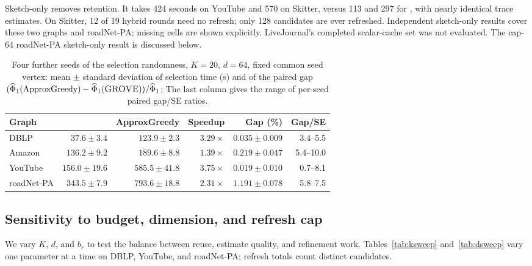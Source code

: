 Sketch-only removes retention. It takes 424 seconds on YouTube and
570 on Skitter, versus 113 and 297 for \alg{}, with nearly identical
trace estimates. On Skitter, 12 of 19 hybrid rounds need no refresh;
only 128 candidates are ever refreshed. Independent sketch-only
results cover these two graphs and roadNet-PA; missing cells are
shown explicitly. LiveJournal's completed scalar-cache set was not
evaluated. The cap-64 roadNet-PA sketch-only result is discussed below.

\begin{table}[t]
\centering\footnotesize
\caption{Four further seeds of the selection randomness, $K=20$,
$d=64$, fixed common seed vertex: mean $\pm$ standard deviation of
selection time (s) and of the paired gap
$(\widehat\Phi_1(\text{ApproxGreedy})-\widehat\Phi_1(\textsc{GROVE}{}))/\widehat\Phi_1$;
The last column gives the range of per-seed paired gap/SE ratios.}\label{tab:seeds5}
\setlength{\tabcolsep}{2pt}
\begin{tabular}{@{}lrrrrr@{}}\toprule
Graph & \alg{} & ApproxGreedy & Speedup & Gap (\%) & Gap/SE\\\midrule
DBLP & $37.6\pm3.4$ & $123.9\pm2.3$ & $3.29\times$ & $0.035\pm0.009$ & 3.4--5.5\\
Amazon & $136.2\pm9.2$ & $189.6\pm8.8$ & $1.39\times$ & $0.219\pm0.047$ & 5.4--10.0\\
YouTube & $156.0\pm19.6$ & $585.5\pm41.8$ & $3.75\times$ & $0.019\pm0.010$ & 0.7--8.1\\
roadNet-PA & $343.5\pm7.9$ & $793.6\pm18.8$ & $2.31\times$ & $1.191\pm0.078$ & 5.8--7.5\\
\bottomrule\end{tabular}
\end{table}

\subsection{Sensitivity to budget, dimension, and refresh cap}\label{sec:sensitivity}
We vary $K$, $d$, and $b_r$ to test the balance between reuse,
estimate quality, and refinement work. Tables~\ref{tab:ksweep}
and~\ref{tab:dsweep} vary one parameter at a time on DBLP,
YouTube, and roadNet-PA; refresh totals count distinct candidates.

